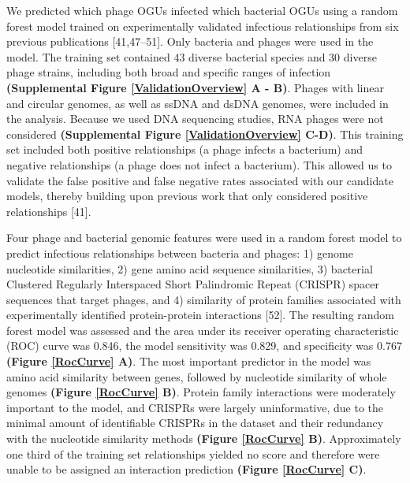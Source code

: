 \documentclass[12pt,]{article}
\begin{document}
We predicted which phage OGUs infected which bacterial OGUs using a
random forest model trained on experimentally validated infectious
relationships from six previous publications {[}41,47--51{]}. Only
bacteria and phages were used in the model. The training set contained
43 diverse bacterial species and 30 diverse phage strains, including
both broad and specific ranges of infection \textbf{(Supplemental Figure
\ref{ValidationOverview} A - B)}. Phages with linear and circular
genomes, as well as ssDNA and dsDNA genomes, were included in the
analysis. Because we used DNA sequencing studies, RNA phages were not
considered \textbf{(Supplemental Figure \ref{ValidationOverview} C-D)}.
This training set included both positive relationships (a phage infects
a bacterium) and negative relationships (a phage does not infect a
bacterium). This allowed us to validate the false positive and false
negative rates associated with our candidate models, thereby building
upon previous work that only considered positive relationships {[}41{]}.

Four phage and bacterial genomic features were used in a random forest
model to predict infectious relationships between bacteria and phages:
1) genome nucleotide similarities, 2) gene amino acid sequence
similarities, 3) bacterial Clustered Regularly Interspaced Short
Palindromic Repeat (CRISPR) spacer sequences that target phages, and 4)
similarity of protein families associated with experimentally identified
protein-protein interactions {[}52{]}. The resulting random forest model
was assessed and the area under its receiver operating characteristic
(ROC) curve was 0.846, the model sensitivity was 0.829, and specificity
was 0.767 \textbf{(Figure \ref{RocCurve} A)}. The most important
predictor in the model was amino acid similarity between genes, followed
by nucleotide similarity of whole genomes \textbf{(Figure \ref{RocCurve}
B)}. Protein family interactions were moderately important to the model,
and CRISPRs were largely uninformative, due to the minimal amount of
identifiable CRISPRs in the dataset and their redundancy with the
nucleotide similarity methods \textbf{(Figure \ref{RocCurve} B)}.
Approximately one third of the training set relationships yielded no
score and therefore were unable to be assigned an interaction prediction
\textbf{(Figure \ref{RocCurve} C)}.
\end{document}

